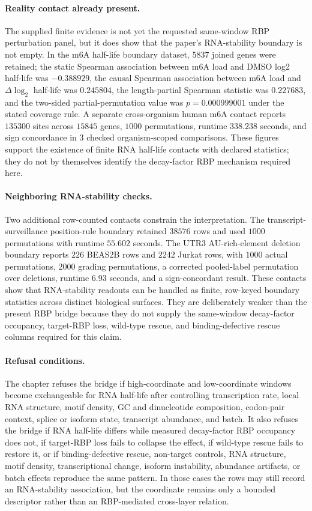 \paragraph{Reality contact already present.}
The supplied finite evidence is not yet the requested same-window RBP perturbation panel, but it does show that the paper's RNA-stability boundary is not empty.  In the m6A half-life boundary dataset, $5837$ joined genes were retained; the static Spearman association between m6A load and DMSO log2 half-life was $-0.388929$, the causal Spearman association between m6A load and $\Delta \log_2$ half-life was $0.245804$, the length-partial Spearman statistic was $0.227683$, and the two-sided partial-permutation value was $p=0.000999001$ under the stated coverage rule.  A separate cross-organism human m6A contact reports $135300$ sites across $15845$ genes, $1000$ permutations, runtime $338.238$ seconds, and sign concordance in $3$ checked organism-scoped comparisons.  These figures support the existence of finite RNA half-life contacts with declared statistics; they do not by themselves identify the decay-factor RBP mechanism required here.

\paragraph{Neighboring RNA-stability checks.}
Two additional row-counted contacts constrain the interpretation.  The transcript-surveillance position-rule boundary retained $38576$ rows and used $1000$ permutations with runtime $55.602$ seconds.  The UTR3 AU-rich-element deletion boundary reports $226$ BEAS2B rows and $2242$ Jurkat rows, with $1000$ actual permutations, $2000$ grading permutations, a corrected pooled-label permutation over deletions, runtime $6.93$ seconds, and a sign-concordant result.  These contacts show that RNA-stability readouts can be handled as finite, row-keyed boundary statistics across distinct biological surfaces.  They are deliberately weaker than the present RBP bridge because they do not supply the same-window decay-factor occupancy, target-RBP loss, wild-type rescue, and binding-defective rescue columns required for this claim.

\paragraph{Refusal conditions.}
The chapter refuses the bridge if high-coordinate and low-coordinate windows become exchangeable for RNA half-life after controlling transcription rate, local RNA structure, motif density, GC and dinucleotide composition, codon-pair context, splice or isoform state, transcript abundance, and batch.  It also refuses the bridge if RNA half-life differs while measured decay-factor RBP occupancy does not, if target-RBP loss fails to collapse the effect, if wild-type rescue fails to restore it, or if binding-defective rescue, non-target controls, RNA structure, motif density, transcriptional change, isoform instability, abundance artifacts, or batch effects reproduce the same pattern.  In those cases the rows may still record an RNA-stability association, but the coordinate remains only a bounded descriptor rather than an RBP-mediated cross-layer relation.

